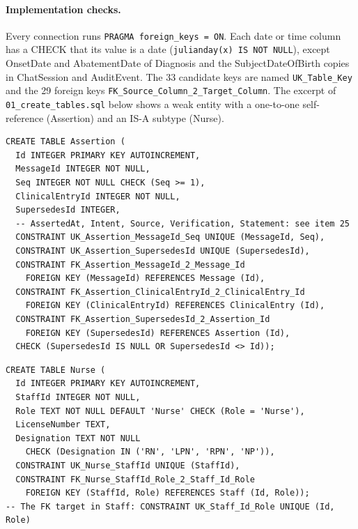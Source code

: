 \documentclass[sigconf]{acmart}
\begin{document}
\paragraph{Implementation checks.} Every connection runs \texttt{PRAGMA foreign\_keys = ON}. Each date or time column has a CHECK that its value is a date (\texttt{julianday(x)\allowbreak{} IS NOT NULL}), except OnsetDate and AbatementDate of Diagnosis and the SubjectDateOfBirth copies in ChatSession and AuditEvent. The 33 candidate keys are named \texttt{UK\_Table\_Key} and the 29 foreign keys \texttt{FK\_Source\_Column\_2\_Target\_Column}. The excerpt of \texttt{01\_create\_tables.sql} below shows a weak entity with a one-to-one self-reference (Assertion) and an IS-A subtype (Nurse).
\par\smallskip\noindent
\begin{minipage}[t]{.53\textwidth}\begin{lstlisting}
CREATE TABLE Assertion (
  Id INTEGER PRIMARY KEY AUTOINCREMENT,
  MessageId INTEGER NOT NULL,
  Seq INTEGER NOT NULL CHECK (Seq >= 1),
  ClinicalEntryId INTEGER NOT NULL,
  SupersedesId INTEGER,
  -- AssertedAt, Intent, Source, Verification, Statement: see item 25
  CONSTRAINT UK_Assertion_MessageId_Seq UNIQUE (MessageId, Seq),
  CONSTRAINT UK_Assertion_SupersedesId UNIQUE (SupersedesId),
  CONSTRAINT FK_Assertion_MessageId_2_Message_Id
    FOREIGN KEY (MessageId) REFERENCES Message (Id),
  CONSTRAINT FK_Assertion_ClinicalEntryId_2_ClinicalEntry_Id
    FOREIGN KEY (ClinicalEntryId) REFERENCES ClinicalEntry (Id),
  CONSTRAINT FK_Assertion_SupersedesId_2_Assertion_Id
    FOREIGN KEY (SupersedesId) REFERENCES Assertion (Id),
  CHECK (SupersedesId IS NULL OR SupersedesId <> Id));
\end{lstlisting}\end{minipage}\hfill
\begin{minipage}[t]{.45\textwidth}\begin{lstlisting}
CREATE TABLE Nurse (
  Id INTEGER PRIMARY KEY AUTOINCREMENT,
  StaffId INTEGER NOT NULL,
  Role TEXT NOT NULL DEFAULT 'Nurse' CHECK (Role = 'Nurse'),
  LicenseNumber TEXT,
  Designation TEXT NOT NULL
    CHECK (Designation IN ('RN', 'LPN', 'RPN', 'NP')),
  CONSTRAINT UK_Nurse_StaffId UNIQUE (StaffId),
  CONSTRAINT FK_Nurse_StaffId_Role_2_Staff_Id_Role
    FOREIGN KEY (StaffId, Role) REFERENCES Staff (Id, Role));
-- The FK target in Staff: CONSTRAINT UK_Staff_Id_Role UNIQUE (Id, Role)
\end{lstlisting}\end{minipage}
\end{document}
